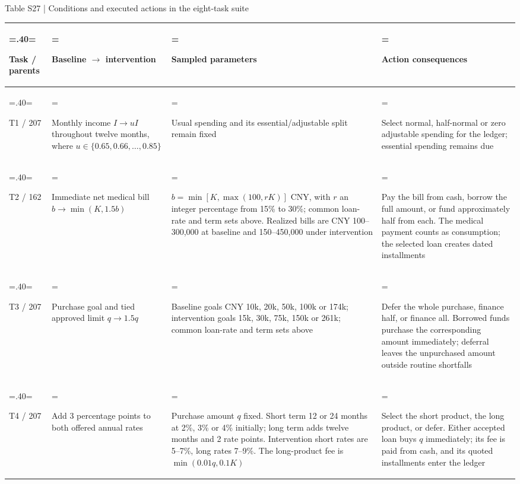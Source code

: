 \documentclass[10pt]{article}
\begin{document}
\begin{center}\begin{minipage}{\textwidth}\fontsize{8}{9.7}\selectfont
Table S27 | Conditions and executed actions in the eight-task suite
\par\vspace{4pt}
\begin{tabularx}{\textwidth}{@{}>{\hsize=.40\hsize\linewidth=\hsize\raggedright\arraybackslash}X>{\hsize=1.20\hsize\linewidth=\hsize\raggedright\arraybackslash}X>{\hsize=1.20\hsize\linewidth=\hsize\raggedright\arraybackslash}X>{\hsize=1.20\hsize\linewidth=\hsize\raggedright\arraybackslash}X@{}}\toprule
Task / parents & Baseline $\to$ intervention & Sampled parameters & Action consequences \\
\midrule
T1 / 207 & Monthly income $I\to uI$ throughout twelve months, where $u\in\{0.65,0.66,\ldots,0.85\}$ & Usual spending and its essential/adjustable split remain fixed & Select normal, half-normal or zero adjustable spending for the ledger; essential spending remains due \\
\addlinespace[4pt]
T2 / 162 & Immediate net medical bill $b\to\min(K,1.5b)$ & $b=\min[K,\max(100,rK)]$ CNY, with $r$ an integer percentage from 15\% to 30\%; common loan-rate and term sets above. Realized bills are CNY 100--300,000 at baseline and 150--450,000 under intervention & Pay the bill from cash, borrow the full amount, or fund approximately half from each. The medical payment counts as consumption; the selected loan creates dated installments \\
\addlinespace[4pt]
T3 / 207 & Purchase goal and tied approved limit $q\to1.5q$ & Baseline goals CNY 10k, 20k, 50k, 100k or 174k; intervention goals 15k, 30k, 75k, 150k or 261k; common loan-rate and term sets above & Defer the whole purchase, finance half, or finance all. Borrowed funds purchase the corresponding amount immediately; deferral leaves the unpurchased amount outside routine shortfalls \\
\addlinespace[4pt]
T4 / 207 & Add 3 percentage points to both offered annual rates & Purchase amount $q$ fixed. Short term 12 or 24 months at 2\%, 3\% or 4\% initially; long term adds twelve months and 2 rate points. Intervention short rates are 5--7\%, long rates 7--9\%. The long-product fee is $\min(0.01q,0.1K)$ & Select the short product, the long product, or defer. Either accepted loan buys $q$ immediately; its fee is paid from cash, and its quoted installments enter the ledger \\
\bottomrule\end{tabularx}
\par{}
\end{minipage}\end{center}
\end{document}
